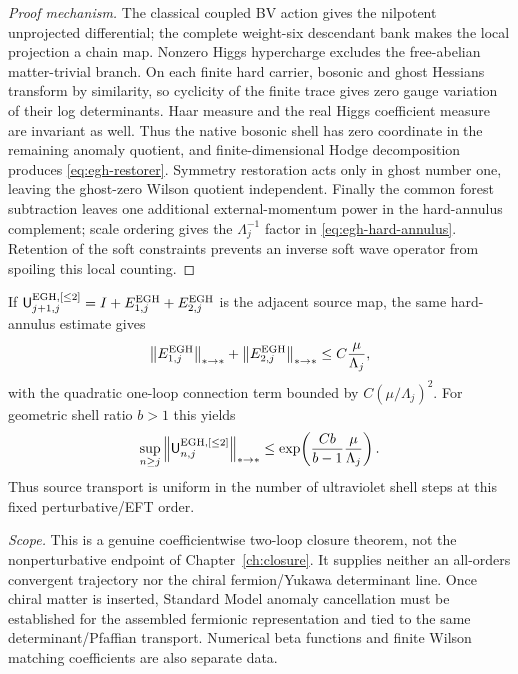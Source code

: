 \documentclass[11pt,a4paper,oneside]{book}
\theoremstyle{plain}
\theoremstyle{definition}
\theoremstyle{remark}
\newcommand{\norm}[1]{\left\lVert#1\right\rVert}
\newcommand{\src}[2]{\cite{#1}}
\newcommand{\scope}[1]{\par\smallskip\noindent\textit{Scope.} #1\par\smallskip}
\begin{document}
\begin{proof}[Proof mechanism]
The classical coupled BV action gives the nilpotent unprojected differential;
the complete weight-six descendant bank makes the local projection a chain
map.  Nonzero Higgs hypercharge excludes the free-abelian matter-trivial
branch.  On each finite hard carrier, bosonic and ghost Hessians transform by
similarity, so cyclicity of the finite trace gives zero gauge variation of
their log determinants.  Haar measure and the real Higgs coefficient measure
are invariant as well.  Thus the native bosonic shell has zero coordinate in
the remaining anomaly quotient, and finite-dimensional Hodge decomposition
produces \eqref{eq:egh-restorer}.  Symmetry restoration acts only in ghost
number one, leaving the ghost-zero Wilson quotient independent.  Finally the
common forest subtraction leaves one additional external-momentum power in the
hard-annulus complement; scale ordering gives the $\Lambda_j^{-1}$ factor in
\eqref{eq:egh-hard-annulus}.  Retention of the soft constraints prevents an
inverse soft wave operator from spoiling this local counting.
\end{proof}
\src{P80}{thm:v80-complex,thm:v80-native-zero,thm:v80-range,thm:v80-annulus,thm:v80-selfmap}

If
$\mathsf U^{\rm EGH,[\le2]}_{j+1,j}
 =I+E^{\rm EGH}_{1,j}+E^{\rm EGH}_{2,j}$
is the adjacent source map, the same hard-annulus estimate gives
\begin{equation}
 \norm{E^{\rm EGH}_{1,j}}_{*\to *}
 +\norm{E^{\rm EGH}_{2,j}}_{*\to *}
 \le C\frac{\mu}{\Lambda_j},
 \label{eq:egh-source-step}
\end{equation}
with the quadratic one-loop connection term bounded by
$C(\mu/\Lambda_j)^2$.  For geometric shell ratio $b>1$ this yields
\begin{equation}
 \sup_{n\ge j}\norm{\mathsf U^{\rm EGH,[\le2]}_{n,j}}_{*\to *}
 \le
 \exp\!\left(\frac{Cb}{b-1}\frac{\mu}{\Lambda_j}\right).
 \label{eq:egh-composed-source}
\end{equation}
Thus source transport is uniform in the number of ultraviolet shell steps at
this fixed perturbative/EFT order.  \src{P80}{cor:v80-source-product}

\scope{This is a genuine coefficientwise two-loop closure theorem, not the
nonperturbative endpoint of Chapter~\ref{ch:closure}.  It supplies neither an
all-orders convergent trajectory nor the chiral fermion/Yukawa determinant
line.  Once chiral matter is inserted, Standard Model anomaly cancellation
must be established for the assembled fermionic representation and tied to the
same determinant/Pfaffian transport.  Numerical beta functions and finite
Wilson matching coefficients are also separate data.}
\end{document}
